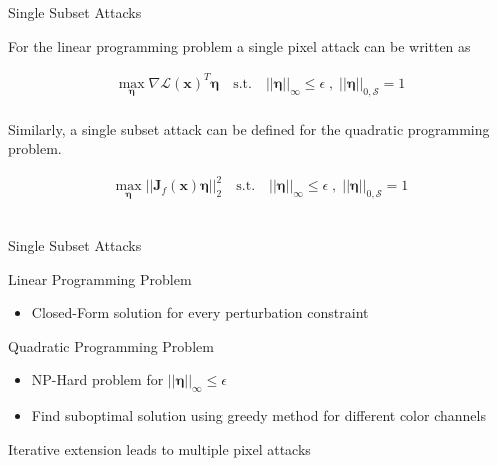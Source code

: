 \documentclass[xcolor={cmyk}]{beamer}
\newcommand{\mcl}{\mathcal}
\newcommand{\bm}{\boldsymbol}
\begin{document}
\begin{frame}{Single Subset Attacks}

	For the linear programming problem a single pixel attack can be written as

	\begin{equation*}
	\begin{aligned}
		\max_{\bm{\eta}} \nabla \mcl{L}(\bm{x})^T \bm{\eta} \quad \text{s.t.} \quad \lvert\lvert \bm{\eta} \rvert\rvert_{\infty} \leq \epsilon \;, \; \lvert\lvert \bm{\eta} \rvert\rvert_{0, \mcl{S}} = 1
	\end{aligned}
	\label{singlesubsetlinear}
	\end{equation*}\\[10pt]

	Similarly, a single subset attack can be defined for the quadratic programming problem.

	\begin{equation*}
	\begin{aligned}
		\max_{\bm{\eta}} \lvert\lvert \bm{J}_f(\bm{x}) \bm{\eta} \rvert\rvert_2^2 \quad \text{s.t.} \quad \lvert\lvert \bm{\eta} \rvert\rvert_{\infty} \leq \epsilon \; , \; \lvert\lvert \bm{\eta} \rvert\rvert_{0,\mcl{S}} = 1
	\end{aligned}
	\label{06_single_quadratic_problem}
	\end{equation*}\\[10pt]

\end{frame}

\begin{frame}{Single Subset Attacks}

	Linear Programming Problem

	\begin{itemize}
		\item Closed-Form solution for every perturbation constraint
	\end{itemize}


	Quadratic Programming Problem

	\begin{itemize}
		\item NP-Hard problem for $\lvert\lvert \bm{\eta} \rvert\rvert_{\infty} \leq \epsilon$
		\item Find suboptimal solution using greedy method for different color channels
	\end{itemize}

	Iterative extension leads to multiple pixel attacks
\end{frame}
\end{document}
